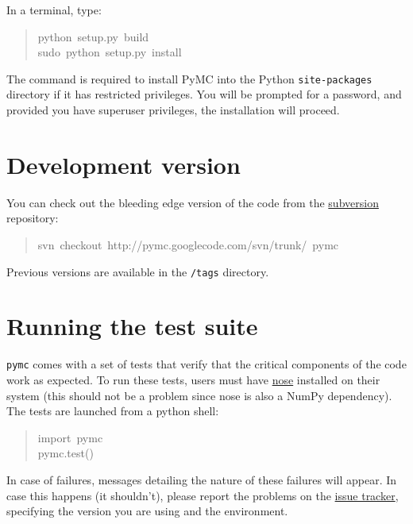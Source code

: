 In a terminal, type:
\begin{quote}{\ttfamily \raggedright \noindent
python~setup.py~build~\\
sudo~python~setup.py~install
}\end{quote}

The  command is required to install PyMC into the Python \texttt{site-packages} 
directory if it has restricted privileges. You will be prompted for a password, 
and provided you have superuser privileges, the installation will proceed.



\hypertarget{development-version}{}
\section*{Development version}

You can check out the bleeding edge version of the code from the \href{http://subversion.tigris.org/}{subversion} 
repository:
\begin{quote}{\ttfamily \raggedright \noindent
svn~checkout~http://pymc.googlecode.com/svn/trunk/~pymc
}\end{quote}

Previous versions are available in the \texttt{/tags} directory.



\hypertarget{running-the-test-suite}{}
\section*{Running the test suite}

\texttt{pymc} comes with a set of tests that verify that the critical components
of the code work as expected. To run these tests, users must have \href{http://somethingaboutorange.com/mrl/projects/nose/}{nose}
installed on their system (this should not be a problem since nose is also
a NumPy dependency). The tests are launched from a python shell:
\begin{quote}{\ttfamily \raggedright \noindent
import~pymc~\\
pymc.test()
}\end{quote}

In case of failures, messages detailing the nature of these failures will 
appear. In case this happens (it shouldn't), please report
the problems on the \href{http://code.google.com/p/pymc/issues/list.}{issue tracker}, specifying the version you are using and 
the environment.


